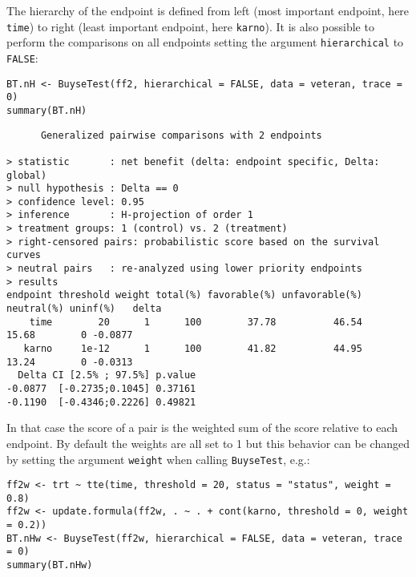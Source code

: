\documentclass[12pt]{article}
\begin{document}
The hierarchy of the endpoint is defined from left (most important
endpoint, here \texttt{time}) to right (least important endpoint, here
\texttt{karno}). It is also possible to perform the comparisons on all
endpoints setting the argument \texttt{hierarchical} to \texttt{FALSE}:
\lstset{language=r,label= ,caption= ,captionpos=b,numbers=none}
\begin{lstlisting}
BT.nH <- BuyseTest(ff2, hierarchical = FALSE, data = veteran, trace = 0)
summary(BT.nH)
\end{lstlisting}

\begin{verbatim}
      Generalized pairwise comparisons with 2 endpoints

> statistic       : net benefit (delta: endpoint specific, Delta: global) 
> null hypothesis : Delta == 0 
> confidence level: 0.95 
> inference       : H-projection of order 1
> treatment groups: 1 (control) vs. 2 (treatment) 
> right-censored pairs: probabilistic score based on the survival curves
> neutral pairs   : re-analyzed using lower priority endpoints
> results
endpoint threshold weight total(%) favorable(%) unfavorable(%) neutral(%) uninf(%)   delta
    time        20      1      100        37.78          46.54      15.68        0 -0.0877
   karno     1e-12      1      100        41.82          44.95      13.24        0 -0.0313
  Delta CI [2.5% ; 97.5%] p.value 
-0.0877  [-0.2735;0.1045] 0.37161 
-0.1190  [-0.4346;0.2226] 0.49821
\end{verbatim}

In that case the score of a pair is the weighted sum of the score
relative to each endpoint. By default the weights are all set to 1 but
this behavior can be changed by setting the argument \texttt{weight} when
calling \texttt{BuyseTest}, e.g.:
\lstset{language=r,label= ,caption= ,captionpos=b,numbers=none}
\begin{lstlisting}
ff2w <- trt ~ tte(time, threshold = 20, status = "status", weight = 0.8)
ff2w <- update.formula(ff2w, . ~ . + cont(karno, threshold = 0, weight = 0.2))
BT.nHw <- BuyseTest(ff2w, hierarchical = FALSE, data = veteran, trace = 0)
summary(BT.nHw)
\end{lstlisting}
\end{document}

